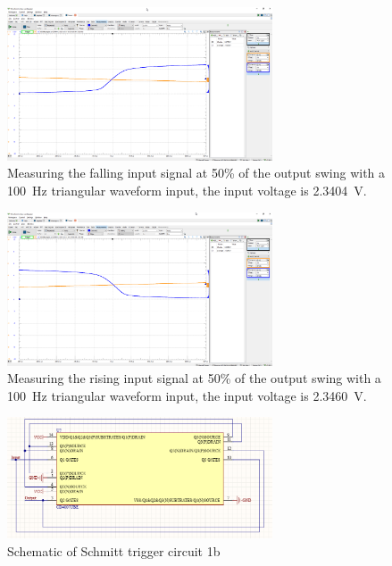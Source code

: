 \documentclass{article}
\begin{document}
	\begin{figure}[H]
	    \centering
	    \includegraphics[width=0.7\textwidth]{2a-2-rising-thresh-lab}
	    \caption[Measuring the falling input signal]{Measuring the falling input signal at 50\% of the output swing with a \SI{100}{Hz} triangular waveform input, the input voltage is \SI{2.3404}{V}.}
	\end{figure}
	
	\begin{figure}[H]
	    \centering
	    \includegraphics[width=0.7\textwidth]{2a-2-falling-thresh-lab}
	    \caption[Measuring the rising input signal]{Measuring the rising input signal at 50\% of the output swing with a \SI{100}{Hz} triangular waveform input, the input voltage is \SI{2.3460}{V}.}
	\end{figure}
		
	\begin{figure}[H]
	    \centering
	    \includegraphics[width=0.7\textwidth]{2b-lab}
	    \caption{Schematic of Schmitt trigger circuit 1b}
	\end{figure}
	
\end{document}
